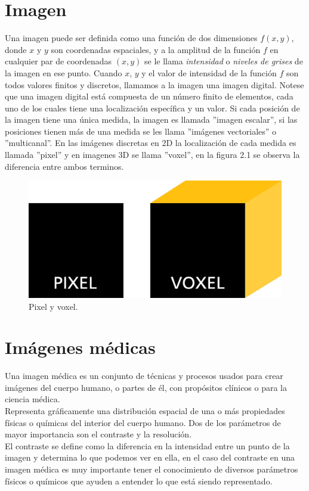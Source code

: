 \documentclass[12pt]{report}
\begin{document}
\section{Imagen}
Una imagen puede ser definida como una función de dos dimensiones $f(x, y)$, donde $x$ y $y$ son coordenadas espaciales, y a la amplitud de la función $f$ en cualquier par de coordenadas $(x, y)$ se le llama \textit{intensidad} o \textit{niveles de grises} de la imagen en ese punto. Cuando $x$, $y$ y el valor de intensidad de la función $f$ son todos valores finitos y discretos, llamamos a la imagen una imagen digital. Notese que una imagen digital está compuesta de un número finito de elementos, cada uno de los cuales tiene una localización específica y un valor. Si cada posición de la imagen tiene una única medida, la imagen es llamada ''imagen escalar'', si las posiciones tienen más de una medida se les llama ''imágenes vectoriales'' o ''multicanal''. En las imágenes discretas en 2D la localización de cada medida es llamada ''pixel'' y en imagenes 3D se llama ''voxel'', en la figura 2.1 se observa la diferencia entre ambos terminos. \cite{metodos} \cite{imag}

\begin{figure}[H]
\centering
\includegraphics[width = 5 cm, height = 3 cm]{pixel}
\caption{Pixel y voxel.}
\end{figure}

\section{Imágenes médicas}
Una imagen médica es un conjunto de técnicas y procesos usados para crear imágenes del cuerpo humano, o partes de él, con propósitos clínicos  o para la ciencia médica.\\

Representa gráficamente una distribución espacial de una o más propiedades físicas o químicas del interior del cuerpo humano. Dos de los parámetros de mayor importancia son el contraste y la resolución. \\

El contraste se define como la diferencia en la intensidad entre un punto de  la imagen y determina lo que podemos ver en ella, en el caso del contraste en una imagen médica es muy importante tener el conocimiento de diversos parámetros físicos o químicos que ayuden a entender lo que está siendo representado.\\
\end{document}
